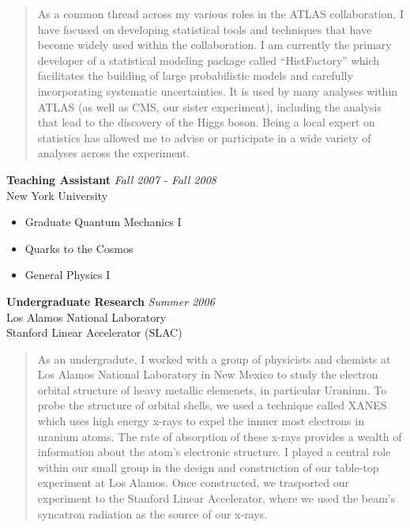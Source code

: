 \documentclass[9pt]{article}
\newenvironment{changemargin}[2]{%
  \begin{list}{}{%
    \setlength{\topsep}{0pt}%
    \setlength{\leftmargin}{#1}%
    \setlength{\rightmargin}{#2}%
    \setlength{\listparindent}{\parindent}%
    \setlength{\itemindent}{\parindent}%
    \setlength{\parsep}{\parskip}%
  }%
  \item[]}{\end{list}
}
\newenvironment{body} {
	\vspace*{-16pt}
	\begin{changemargin}{-0.25in}{-0.5in}
  }	
	{\end{changemargin}
}
\begin{document}
\begin{body}
\begin{quotation}
          \smallskip

          As a common thread across my various roles in the ATLAS collaboration, I have focused on developing statistical tools and techniques that have become widely used within the collaboration. 
          I am currently the primary developer of a statistical modeling package called “HistFactory” which facilitates the building of large probabilistic models 
          and carefully incorporating systematic uncertainties. 
          It is used by many analyses within ATLAS (as well as CMS, our sister experiment), including the analysis that lead to the discovery of the Higgs boson.  
          Being a local expert on statistics has allowed me to advise or participate in a wide variety of analyses across the experiment.

        \end{quotation}
        
        \medskip

	\textbf {Teaching Assistant} \hfill \emph{Fall 2007 - Fall 2008}\\
        New York University \\
	\vspace*{-4pt}
	\begin{itemize} \itemsep -0pt
		\item Graduate Quantum Mechanics I
		\item Quarks to the Cosmos
                \item General Physics I
	\end{itemize}

        \medskip

	\textbf {Undergraduate Research} \hfill \emph{Summer 2006}\\
        Los Alamos National Laboratory \\
        Stanford Linear Accelerator (SLAC) \\

        \begin{quotation}
          \justifying
          
          As an undergradute, I worked with a group of physicists and chemists at Los Alamos National Laboratory in New Mexico 
          to study the electron orbital structure of heavy metallic elemenets, in particular Uranium.
          To probe the structure of orbital shells, we used a technique called XANES which uses high energy x-rays to expel the innner most electrons in uranium atoms.
          The rate of absorption of these x-rays provides a wealth of information about the atom's electronic structure.
          I played a central role within our small group in the design and construction of our table-top experiment at Los Alamos.
          Once constructed, we trasported our experiment to the Stanford Linear Accelerator, where we used the beam's syncatron radiation as the source of our x-rays.

        \end{quotation}

\end{body}
\end{document}
